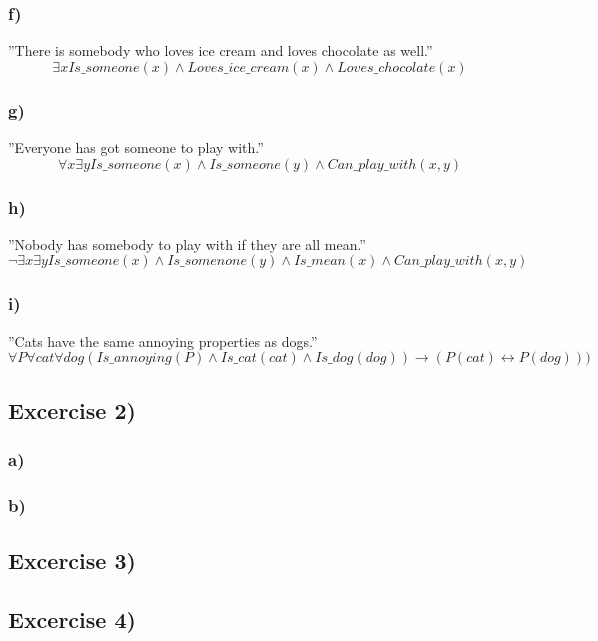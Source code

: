 \documentclass[12pt]{article}
\begin{document}
\subsubsection*{f)}
”There is somebody who loves ice cream and loves chocolate as well.”
\begin{equation}
  \exists x Is\_someone(x) \land Loves\_ice\_cream(x) \land Loves\_chocolate(x)
\end{equation}
\subsubsection*{g)}
”Everyone has got someone to play with.”
\begin{equation}
  \forall x \exists y Is\_someone(x) \land Is\_someone(y) \land Can\_play\_with(x, y)
\end{equation}
\subsubsection*{h)}
”Nobody has somebody to play with if they are all mean.”
\begin{equation}
  \neg \exists x \exists y Is\_someone(x) \land Is\_somenone(y) \land Is\_mean(x) \land Can\_play\_with(x, y)
\end{equation}
\subsubsection*{i)}
”Cats have the same annoying properties as dogs.”
\begin{equation}
  \forall P \forall cat \forall dog (Is\_annoying(P) \land Is\_cat(cat) \land Is\_dog(dog)) \rightarrow  (P(cat) \leftrightarrow P(dog)))
\end{equation}
\subsection*{Excercise 2)}
\subsubsection*{a)}
\subsubsection*{b)}
\subsection*{Excercise 3)}
\subsection*{Excercise 4)}
\end{document}
